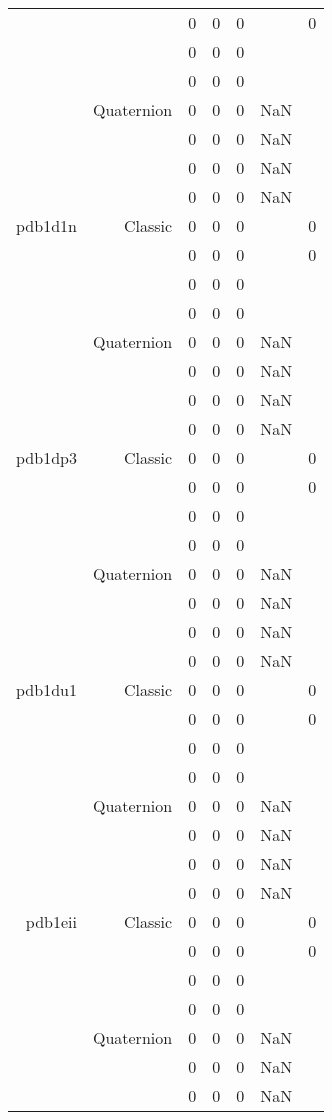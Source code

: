 \begin{xltabular}{\textwidth}{r|rcccSc}
& & 0 & 0 & 0 & & 0 \\
& & 0 & 0 & 0 & & \\
& & 0 & 0 & 0 & & \\
& Quaternion & 0 & 0 & 0 & NaN & \\
& & 0 & 0 & 0 & NaN & \\
& & 0 & 0 & 0 & NaN & \\
& & 0 & 0 & 0 & NaN & \\ \addlinespace
pdb1d1n & Classic & 0 & 0 & 0 & & 0 \\
& & 0 & 0 & 0 & & 0 \\
& & 0 & 0 & 0 & & \\
& & 0 & 0 & 0 & & \\
& Quaternion & 0 & 0 & 0 & NaN & \\
& & 0 & 0 & 0 & NaN & \\
& & 0 & 0 & 0 & NaN & \\
& & 0 & 0 & 0 & NaN & \\ \addlinespace
pdb1dp3 & Classic & 0 & 0 & 0 & & 0 \\
& & 0 & 0 & 0 & & 0 \\
& & 0 & 0 & 0 & & \\
& & 0 & 0 & 0 & & \\
& Quaternion & 0 & 0 & 0 & NaN & \\
& & 0 & 0 & 0 & NaN & \\
& & 0 & 0 & 0 & NaN & \\
& & 0 & 0 & 0 & NaN & \\ \addlinespace
pdb1du1 & Classic & 0 & 0 & 0 & & 0 \\
& & 0 & 0 & 0 & & 0 \\
& & 0 & 0 & 0 & & \\
& & 0 & 0 & 0 & & \\
& Quaternion & 0 & 0 & 0 & NaN & \\
& & 0 & 0 & 0 & NaN & \\
& & 0 & 0 & 0 & NaN & \\
& & 0 & 0 & 0 & NaN & \\ \addlinespace
pdb1eii & Classic & 0 & 0 & 0 & & 0 \\
& & 0 & 0 & 0 & & 0 \\
& & 0 & 0 & 0 & & \\
& & 0 & 0 & 0 & & \\
& Quaternion & 0 & 0 & 0 & NaN & \\
& & 0 & 0 & 0 & NaN & \\
& & 0 & 0 & 0 & NaN & \\

\end{xltabular}
